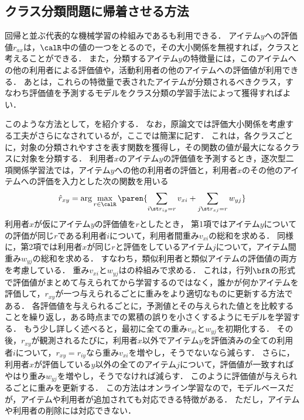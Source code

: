 \subsection{クラス分類問題に帰着させる方法}

回帰と並ぶ代表的な機械学習の枠組みであるも利用できる．
アイテム$y$への評価値$r_{ax}$は，$\calR$中の値の一つをとるので，その大小関係を無視すれば，クラスと考えることができる．
また，分類するアイテム$y$の特徴量には，このアイテムへの他の利用者による評価値や，活動利用者の他のアイテムへの評価値が利用できる．
あとは，これらの特徴量で表されたアイテムが分類されるべきクラス，すなわち評価値を予測するモデルをクラス分類の学習手法によって獲得すればよい．

このような方法として，\cite{icml:98:01,jb:032:04}を紹介する．
なお，原論文では評価大小関係を考慮する工夫がさらになされているが，ここでは簡潔に記す．
これは，各クラスごとに，対象の分類されやすさを表す関数を獲得し，その関数の値が最大になるクラスに対象を分類する．
利用者$x$のアイテム$y$の評価値を予測するとき，逐次型二項関係学習法では，アイテム$y$への他の利用者の評価と，利用者$x$のその他のアイテムへの評価を入力とした次の関数を用いる
\begin{equation}
\hat{r}_{xy}=\arg\max_{r\in \calR}
\paren{\sum_{i\st r_{iy}=r}v_{xi}+\sum_{j\st r_{xj}=r}w_{yj}}
\label{eq:cglr}
\end{equation}
利用者$x$が仮にアイテム$y$の評価値を$r$としたとき，
第1項ではアイテム$y$についての評価が同じ$r$である利用者$i$について，利用者間重み$v_{xi}$の総和を求める．
同様に，第2項では利用者$x$が同じ$r$と評価をしているアイテム$j$について，アイテム間重み$w_{yj}$の総和を求める．
すなわち，類似利用者と類似アイテムの評価値の両方を考慮している．
重み$v_{xi}$と$w_{yj}$は\cite{jjsai:99:02}の枠組みで求める．
これは，行列$\bfR$の形式で評価値がまとめて与えられてから学習するのではなく，誰かが何かアイテムを評価して，$r_{xy}$が一つ与えられるごとに重みをより適切なものに更新する方法である．
各評価値を与えられるごとに，予測値とその与えられた値とを比較することを繰り返し，ある時点までの累積の誤りを小さくするようにモデルを学習する．
もう少し詳しく述べると，最初に全ての重み$v_{xi}$と$w_{yj}$を初期化する．
その後，$r_{xy}$が観測されるたびに，利用者$x$以外でアイテム$y$を評価済みの全ての利用者$i$について，$r_{xy}=r_{iy}$なら重み$v_{xi}$を増やし，そうでないなら減らす．
さらに，利用者$x$が評価している$y$以外の全てのアイテム$j$について，評価値が一致すればやはり重み$w_{yj}$を増やし，そうでなければ減らす．
このように評価値が与えられるごとに重みを更新する．
この方法はオンライン学習なので，モデルベースだが，アイテムや利用者が追加されても対応できる特徴がある．
ただし，アイテムや利用者の削除には対応できない．

